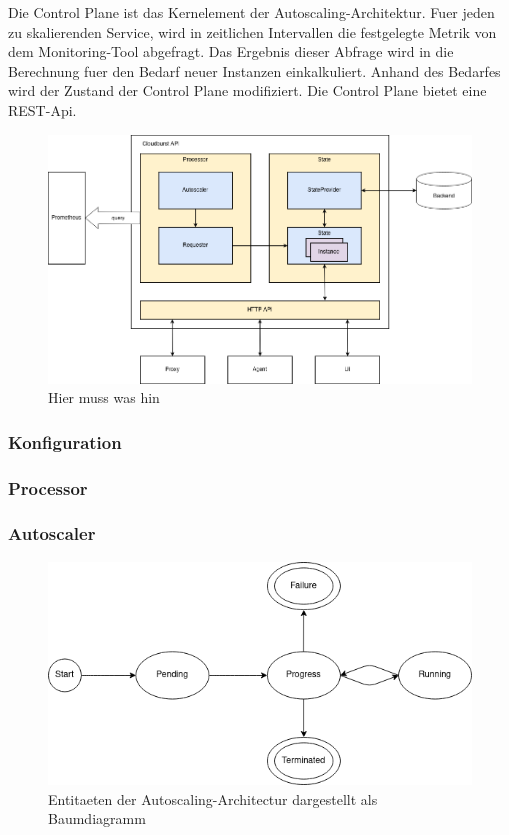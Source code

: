 \documentclass[runningheads]{llncs}
\begin{document}
Die Control Plane ist das Kernelement der Autoscaling-Architektur. Fuer jeden zu skalierenden Service, wird in zeitlichen Intervallen die festgelegte Metrik von dem Monitoring-Tool abgefragt. Das Ergebnis dieser Abfrage wird in die Berechnung fuer den Bedarf neuer Instanzen einkalkuliert. Anhand des Bedarfes wird der Zustand der Control Plane modifiziert. Die Control Plane bietet eine REST-Api. 
	
\begin{figure}[h]
	\centering
	\includegraphics[width=1.0\linewidth,scale=1.0]{images/autoscaler.png}
	\caption{Hier muss was hin}
\end{figure}

\subsubsection{Konfiguration} \label{configuration}
	
\subsubsection{Processor}
	
\subsubsection{Autoscaler}

\begin{figure}[h]
	\centering
	\includegraphics[width=0.8\linewidth,scale=0.8]{images/state.png}
	\caption{Entitaeten der Autoscaling-Architectur dargestellt als Baumdiagramm}
\end{figure}
	
\end{document}
